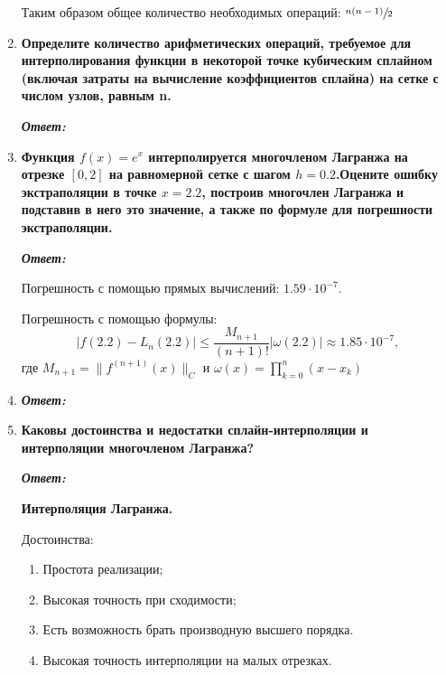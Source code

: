 \documentclass[12pt, a4paper]{article}
\newcommand{\norm}[1]{\lVert #1 \rVert}
\newcommand{\abs}[1]{\lvert #1 \rvert}
\begin{document}
\begin{enumerate}
	Таким образом общее количество необходимых операций: $\sfrac{n(n-1)}{2}$
	
	\item \textbf{Определите количество арифметических операций, требуемое для интерполирования функции в некоторой точке кубическим сплайном (включая затраты на вычисление коэффициентов сплайна) на сетке с числом узлов, равным n.}
	\vspace*{0.2cm}
	
	\textit{\textbf{Ответ:}}
	
	
		
	\item \textbf{Функция $f(x) = e ^ x$ интерполируется многочленом Лагранжа на отрезке $[0, 2]$ на равномерной сетке с шагом $h=0.2$.Оцените ошибку экстраполяции в точке $x = 2.2$, построив многочлен Лагранжа и подставив в него это значение, а также по формуле для погрешности экстраполяции.}
	\vspace*{0.2cm}

	\textit{\textbf{Ответ:}}
	
	Погрешность с помощью прямых вычислений: $1.59 \cdot 10^{-7}$.
	
	Погрешность с помощью формулы:
	\[
	\abs{f(2.2) - L_n(2.2)} \le \dfrac{M_{n+1}}{(n+1)!}\abs{\omega(2.2)} \approx 1.85 \cdot 10^{-7},
	\]
	где $M_{n+1} = \norm{f^{(n+1)}(x)}_C$ и $\omega(x) = \prod\limits_{k=0}^{n}(x - x_k)$
	
	\item \textbf{}
	\vspace*{0.2cm}
	
	\textit{\textbf{Ответ:}}
	
	\item \textbf{Каковы достоинства и недостатки сплайн-интерполяции и интерполяции многочленом Лагранжа?}
	\vspace*{0.2cm}
	
	\textit{\textbf{Ответ:}}
	
	\textbf{Интерполяция Лагранжа.}
	
	Достоинства:
	\begin{enumerate}
		\item Простота реализации;
		\item Высокая точность при сходимости;
		\item Есть возможность брать производную высшего порядка.
		\item Высокая точность интерполяции на малых отрезках.
	\end{enumerate}
	

\end{enumerate}
\end{document}
